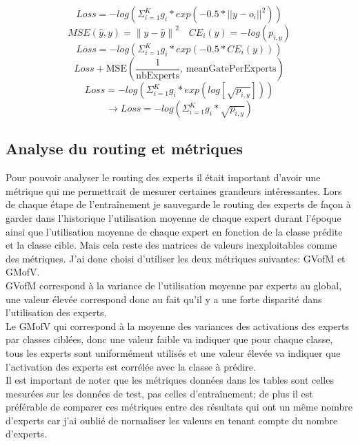 \documentclass{article}
\begin{document}
\begin{equation} Loss = -log(\Sigma_{i=1}^{K}g_i*exp(-0.5*||y-o_i||^2)) \label{eq:loss_original} \end{equation}
\begin{equation*} MSE(\hat{y}, y) = \left\| y - \hat{y} \right\|^2 \quad CE_i(y) = -log(p_{i,y}) \end{equation*}
\begin{equation} Loss = -log(\Sigma_{i=1}^{K}g_i*exp(-0.5*CE_i(y))) \label{eq:loss_adapted} \end{equation}
\begin{equation} Loss + \text{MSE}(\frac{1}{\text{nbExperts}}\text{, } \text{meanGatePerExperts}) \label{eq:load_simple} \end{equation}
\begin{equation*} Loss = -log(\Sigma_{i=1}^{K}g_i*exp(log[\sqrt{p_{i,y}}])) \end{equation*}
\begin{equation} \xrightarrow{} Loss = -log(\Sigma_{i=1}^{K}g_i*\sqrt{p_{i,y}}) \label{eq:loss_simplified} \end{equation}


\subsection{Analyse du routing et métriques}

Pour pouvoir analyser le routing des experts il était important d'avoir une métrique qui me permettrait de mesurer certaines grandeurs intéressantes. Lors de chaque étape de l'entraînement je sauvegarde le routing des experts de façon à garder dans l'historique l'utilisation moyenne de chaque expert durant l'époque ainsi que l'utilisation moyenne de chaque expert en fonction de la classe prédite et la classe cible. Mais cela reste des matrices de valeurs inexploitables comme des métriques. J'ai donc choisi d'utiliser les deux métriques suivantes: GVofM et GMofV.\\
GVofM correspond à la variance de l'utilisation moyenne par experts au global, une valeur élevée correspond donc au fait qu'il y a une forte disparité dans l'utilisation des experts. \\
Le GMofV qui correspond à la moyenne des variances des activations des experts par classes ciblées, donc une valeur faible va indiquer que pour chaque classe, tous les experts sont uniformément utilisés et une valeur élevée va indiquer que l'activation des experts est corrélée avec la classe à prédire.\\
Il est important de noter que les métriques données dans les tables sont celles mesurées sur les données de test, pas celles d'entraînement; de plus il est préférable de comparer ces métriques entre des résultats qui ont un même nombre d'experts car j'ai oublié de normaliser les valeurs en tenant compte du nombre d'experts.
\end{document}
